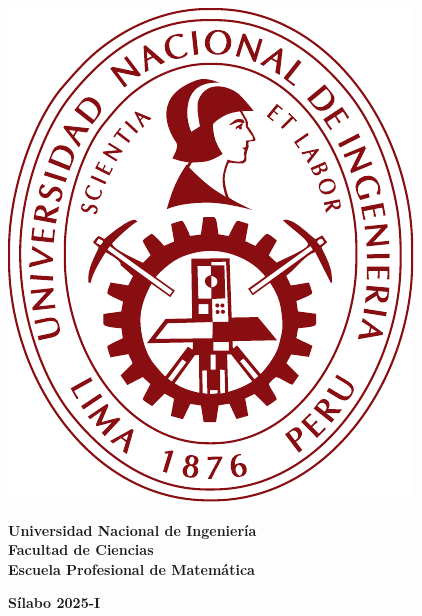 \noindent
\begin{minipage}[c]{0.15\textwidth}\vspace{0pt}
  \includegraphics[width=\textwidth]{logo}
\end{minipage}%
\hfill
\begin{minipage}[c]{0.8\textwidth}\vspace{0pt}
  \bfseries\large\sffamily
  Universidad Nacional de Ingeniería \\
  Facultad de Ciencias \\
  Escuela Profesional de Matemática
\end{minipage}

\smallskip
\hrulefill

\begin{center}\bfseries\Large\sffamily
  Sílabo 2025-I
\end{center}
